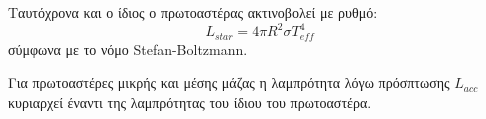 Ταυτόχρονα και ο ίδιος ο πρωτοαστέρας ακτινοβολεί με ρυθμό:
\begin{equation}
L_{star}=4 \pi R^2 \sigma T_{eff} ^4
\end{equation}
σύμφωνα με το νόμο Stefan-Boltzmann.


Για πρωτοαστέρες μικρής και μέσης μάζας η λαμπρότητα λόγω πρόσπτωσης $L_{acc}$ κυριαρχεί έναντι της λαμπρότητας του ίδιου του πρωτοαστέρα.
